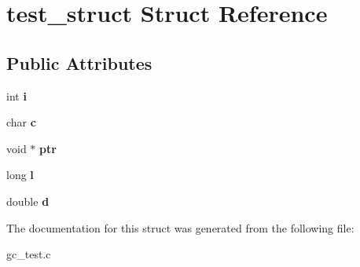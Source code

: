 \hypertarget{structtest__struct}{}\section{test\+\_\+struct Struct Reference}
\label{structtest__struct}
\subsection*{Public Attributes}
\begin{DoxyCompactItemize}
\item 
\hypertarget{structtest__struct_af83b58915cfa71e1aecdee37ab6a90e4}{}int {\bfseries i}\label{structtest__struct_af83b58915cfa71e1aecdee37ab6a90e4}

\item 
\hypertarget{structtest__struct_aaa06c5e545861f5e6b24f90b460cc6da}{}char {\bfseries c}\label{structtest__struct_aaa06c5e545861f5e6b24f90b460cc6da}

\item 
\hypertarget{structtest__struct_a54bc6000450b59faa3a791f044ecb8fb}{}void $\ast$ {\bfseries ptr}\label{structtest__struct_a54bc6000450b59faa3a791f044ecb8fb}

\item 
\hypertarget{structtest__struct_a169248f38460a21a2aae898b45fc3107}{}long {\bfseries l}\label{structtest__struct_a169248f38460a21a2aae898b45fc3107}

\item 
\hypertarget{structtest__struct_a74068b2ff3c63ec28ef6686f24133697}{}double {\bfseries d}\label{structtest__struct_a74068b2ff3c63ec28ef6686f24133697}

\end{DoxyCompactItemize}


The documentation for this struct was generated from the following file\+:\begin{DoxyCompactItemize}
\item 
gc\+\_\+test.\+c\end{DoxyCompactItemize}
